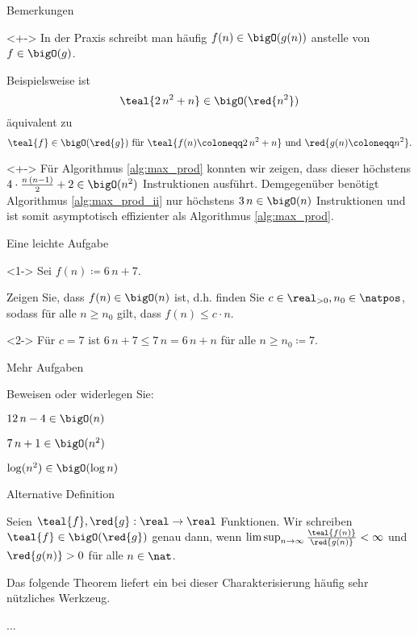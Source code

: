 \begin{frame}{Bemerkungen}
\begin{remark}<+->
In der Praxis schreibt man h\"aufig $f(n) \in \bigO(g(n))$ anstelle von $f \in \bigO(g)$.

Beispielsweise ist $$\teal{2 \, n^2 + n} \in \bigO(\red{n^2})$$ \"aquivalent zu $$\teal{f} \in \bigO(\red{g}) \text{ f\"ur } \teal{f(n) \coloneqq 2 \, n^2 + n} \text{ und } \red{g(n) \coloneqq n^2}.$$
\end{remark}

\begin{remark}<+->
F\"ur Algorithmus \ref{alg:max_prod} konnten wir zeigen, dass dieser h\"ochstens $4 \cdot \frac{n \, (n-1)}{2} + 2 \in \bigO(n^2)$ Instruktionen ausf\"uhrt.
Demgegen\"uber ben\"otigt Algorithmus \ref{alg:max_prod_ii} nur h\"ochstens $3 \, n \in \bigO(n)$ Instruktionen und ist somit \alert{asymptotisch} effizienter als Algorithmus \ref{alg:max_prod}.
\end{remark}
\end{frame}

\begin{frame}{Eine leichte Aufgabe}
\begin{task}<1->
Sei $f(n) \coloneqq 6 \, n + 7$.

Zeigen Sie, dass $f(n) \in \bigO(n)$ ist, d.h. finden Sie $c \in \real_{> 0}, n_0 \in \natpos$, sodass f\"ur alle $n \geq n_0$ gilt, dass $f(n) \leq c \cdot n$.
\end{task}

\begin{solution}<2->
F\"ur $c = 7$ ist $6 \, n + 7 \leq 7 \, n = 6 \, n + n$ f\"ur alle $n \geq n_0 \coloneqq 7$.
\end{solution}
\end{frame}

\begin{frame}{Mehr Aufgaben}
\begin{task}
Beweisen oder widerlegen Sie:
\begin{subtasks}
    \item $12 \, n - 4 \in \bigO(n)$
    \item $7 \, n + 1 \in \bigO(n^2)$
    \item $\log(n^2) \in \bigO(\log n)$
\end{subtasks}
\end{task}
\end{frame}

\begin{frame}{Alternative Definition}
\begin{definition}
Seien $\teal{f}, \red{g}: \real \to \real$ Funktionen.
Wir schreiben $\teal{f} \in \bigO(\red{g})$ genau dann, wenn $\limsup_{n \to \infty} \frac{\teal{f(n)}}{\red{g(n)}} < \infty$ und $\red{g(n)} > 0$ f\"ur alle $n \in \nat$.
\end{definition}

Das folgende Theorem liefert ein bei dieser Charakterisierung h\"aufig sehr n\"utzliches Werkzeug.

\begin{theorem}
...
\end{theorem}
\end{frame}

